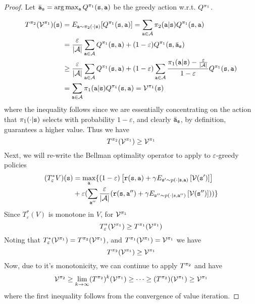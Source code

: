 \begin{proof}
Let $\bar{{\tt a}}_{\tt s}=\arg\max_{\tt a}
Q^{\pi_1}({\tt s},{\tt a})$ be the greedy action w.r.t. $Q^{\pi_1}$.

\begin{align*}
T^{\pi_2}(\mathcal{V}^{\pi_1})({\tt s}) &= E_{{\tt a}\sim\pi_2(\cdot|{\tt s})}[Q^{\pi_1}({\tt s},{\tt a})] = \sum_{{\tt a} \in \mathcal{A}} \pi_2({\tt a}|{\tt s}) Q^{\pi_1}({\tt s},{\tt a})\\
&= \frac{\varepsilon}{|\mathcal{A}|}\sum_{{\tt a} \in \mathcal{A}}
Q^{\pi_1}({\tt s},{\tt a})+(1-\varepsilon)Q^{\pi_1}({\tt s},\bar{{\tt a}}_{\tt s})\\
&\geq \frac{\varepsilon}{|\mathcal{A}|}\sum_{{\tt a} \in \mathcal{A}}
Q^{\pi_1}({\tt s},{\tt a})+(1-\varepsilon)\sum_{{\tt a} \in
\mathcal{A}}
\frac{\pi_1({\tt a}|{\tt s})-\frac{\varepsilon}{|\mathcal{A}|}}{1-\varepsilon}Q^{\pi_1}({\tt s},{\tt a})\\
&=\sum_{{\tt a} \in \mathcal{A}} \pi_1({\tt a}|{\tt s})Q^{\pi_1}({\tt s},{\tt a})=\mathcal{V}^{\pi_1}({\tt s})
\end{align*}
where the inequality follows since we are essentially concentrating on
the action that $\pi_1(\cdot|{\tt s})$ selects with probability
$1-\varepsilon$, and clearly $\bar{{\tt a}}_{\tt s}$, by definition,
guarantees a higher value. Thus we have
\[T^{\pi_2}(\mathcal{V}^{\pi_1}) \geq \mathcal{V}^{\pi_1}\]
Next, we will re-write the Bellman optimality operator to
apply to $\varepsilon$-greedy policies
\begin{align*}
(T_{\varepsilon}^{*}V)({\tt s}) & =\max_{{\tt a}}\{ \left(1-\varepsilon\right)\left[{\tt r}({\tt s},{\tt a})+\gamma E_{{\tt s}'\sim p(\cdot|{\tt s},{\tt a})}\left[\mathcal{V}({\tt s}')\right]\right]\\
 & +\varepsilon(\sum_{{\tt a}''}\frac{\varepsilon}{|\mathcal{A}|}({\tt r}({\tt s},{\tt a}'')+\gamma E_{{\tt s}''\sim p(\cdot|s,{\tt a}'')}\left[\mathcal{V}({\tt s}'')\right]))\} 
\end{align*}
Since $T^*_\varepsilon(V)$ is monotone in $V$, for $\mathcal{V}^{\pi_1}$
\[
T^*_\varepsilon(\mathcal{V}^{\pi_1}) \geq T^{\pi_1}(\mathcal{V}^{\pi_1})
\]
Noting that $T^*_\varepsilon(\mathcal{V}^{\pi_1})=T^{\pi_2}(\mathcal{V}^{\pi_1})$, 
and $T^{\pi_1}(\mathcal{V}^{\pi_1})=\mathcal{V}^{\pi_1}$ we have
\[
T^{\pi_2}(\mathcal{V}^{\pi_1}) \geq \mathcal{V}^{\pi_1}
\]
Now, due to it's monotonicity, we can continue to apply $T^{\pi_2}$ and 
have
\[
\mathcal{V}^{\pi_2} \geq \lim_{k\rightarrow \infty}(T^{\pi_2})^k
(\mathcal{V}^{\pi_1}) \geq \cdots \geq (T^{\pi_2}) (\mathcal{V}^{\pi_1}) \geq \mathcal{V}^{\pi_1}
\]
where the first inequality follows from the convergence of value iteration.
\end{proof}

